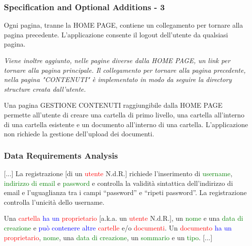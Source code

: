 \documentclass[aspectratio=169]{beamer}
\begin{document}
\begin{frame}
    \frametitle{Specification and Optional Additions - 3}
    Ogni pagina, tranne la HOME PAGE, contiene un collegamento per tornare alla pagina precedente. L’applicazione
    consente il logout dell’utente da qualsiasi pagina. \newline

    \textit{Viene inoltre aggiunto, nelle pagine diverse dalla HOME PAGE, un link per tornare alla pagina principale.
        Il collegamento per tornare alla pagina precedente, nella pagina "CONTENUTI" è implementato in modo da seguire
        la directory structure creata dall'utente.} \newline

    Una pagina GESTIONE CONTENUTI raggiungibile dalla HOME PAGE permette all’utente di creare una cartella di primo
    livello, una cartella all’interno di una cartella esistente e un documento all’interno di una cartella.
    L’applicazione non richiede la gestione dell’upload dei documenti.
\end{frame}

\begin{frame}
    \frametitle{Data Requirements Analysis}
    [...] La registrazione [di un \textcolor{Red}{utente} N.d.R.] richiede l’inserimento di
    \textcolor{Green}{username}, \textcolor{Green}{indirizzo di email} e \textcolor{Green}{password} e controlla la
    validità sintattica dell’indirizzo di email e l’uguaglianza tra i campi “password” e “ripeti password”. La
    registrazione controlla l’unicità dello username. \newline

    Una \textcolor{Red}{cartella} \textcolor{Blue}{ha un} \textcolor{Red}{proprietario} [a.k.a. un
        \textcolor{Red}{utente} N.d.R.], un \textcolor{Green}{nome} e una \textcolor{Green}{data di creazione} e
    \textcolor{Blue}{può contenere altre} \textcolor{Red}{cartelle} e/o \textcolor{Red}{documenti}. Un
    \textcolor{Red}{documento} \textcolor{Blue}{ha un} \textcolor{Red}{proprietario}, \textcolor{Green}{nome}, una
    \textcolor{Green}{data di creazione}, un \textcolor{Green}{sommario} e un \textcolor{Green}{tipo}.
    [...]\footnotemark{}

\end{frame}
\end{document}

